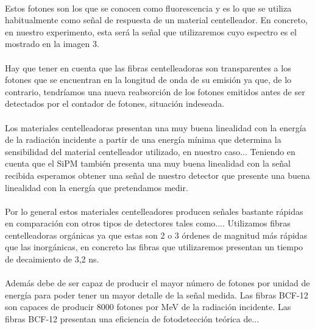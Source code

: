 \documentclass[11pt, a4paper]{article}
\begin{document}
\paragraph {}
Estos fotones son los que se conocen como fluorescencia y es lo que se utiliza habitualmente como señal de respuesta de un material centelleador. En concreto, en nuestro experimento, esta será la señal que utilizaremos cuyo espectro es el mostrado en la imagen 3.

\paragraph {}
Hay que tener en cuenta que las fibras centelleadoras son transparentes a los fotones que se encuentran en la longitud de onda de su emisión ya que, de lo contrario, tendríamos una nueva reabsorción de los fotones emitidos antes de ser detectados por el contador de fotones, situación indeseada.

\paragraph {}
Los materiales centelleadoras presentan una muy buena linealidad con la energía de la radiación incidente a partir de una energía mínima que determina la sensibilidad del material centelleador utilizado, en nuestro caso... Teniendo en cuenta que el SiPM también presenta una muy buena linealidad con la señal recibida esperamos obtener una señal de nuestro detector que presente una buena linealidad con la energía que pretendamos medir.

\paragraph {}
Por lo general estos materiales centelleadores producen señales bastante rápidas en comparación con otros tipos de detectores tales como.... Utilizamos fibras centelleadoras orgánicas ya que estas son 2 o 3 órdenes de magnitud más rápidas que las inorgánicas,  en concreto las fibras que utilizaremos presentan un tiempo de decaimiento de 3,2 ns. 

\paragraph {}
Además debe de ser capaz de producir el mayor número de fotones por unidad de energía para poder tener un mayor detalle de la señal medida. Las fibras BCF-12 son capaces de producir 8000 fotones por MeV de la radiación incidente. Las fibras BCF-12 presentan una eficiencia de fotodetección teórica de...
\end{document}
